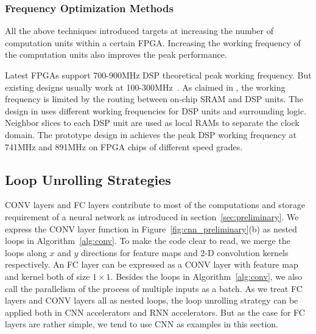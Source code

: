 \subsubsection{Frequency Optimization Methods}
All the above techniques introduced targets at increasing the number of computation units within a certain FPGA. Increasing the working frequency of the computation units also improves the peak performance.

Latest FPGAs support 700-900MHz DSP theoretical peak working frequency. But existing designs usually work at 100-300MHz~\cite{qiu2016going, guo2017angel, zhang2016caffeine, ma2017optimizing}. As claimed in \cite{wu2017high}, the working frequency is limited by the routing between on-chip SRAM and DSP units. The design in \cite{wu2017high} uses different working frequencies for DSP units and surrounding logic. Neighbor slices to each DSP unit are used as local RAMs to separate the clock domain. The prototype design in \cite{wu2017high} achieves the peak DSP working frequency at 741MHz and 891MHz on FPGA chips of different speed grades. 

\subsection{Loop Unrolling Strategies}\label{sec:hardware:lu}
CONV layers and FC layers contribute to most of the computations and storage requirement of a neural network as introduced in section~\ref{sec:preliminary}. We express the CONV layer function in Figure~\ref{fig:cnn_preliminary}(b) as nested loops in Algorithm~\ref{alg:conv}. To make the code clear to read, we merge the loops along $x$ and $y$ directions for feature maps and 2-D convolution kernels respectively. An FC layer can be expressed as a CONV layer with feature map and kernel both of size $1\times 1$. Besides the loops in Algorithm~\ref{alg:conv}, we also call the parallelism of the process of multiple inputs as a batch. As we treat FC layers and CONV layers all as nested loops, the loop unrolling strategy can be applied both in CNN accelerators and RNN accelerators. But as the case for FC layers are rather simple, we tend to use CNN as examples in this section.

